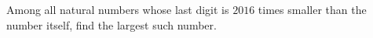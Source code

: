 Among all natural numbers whose last digit is $2016$ times smaller than the number itself, find the largest such number.
